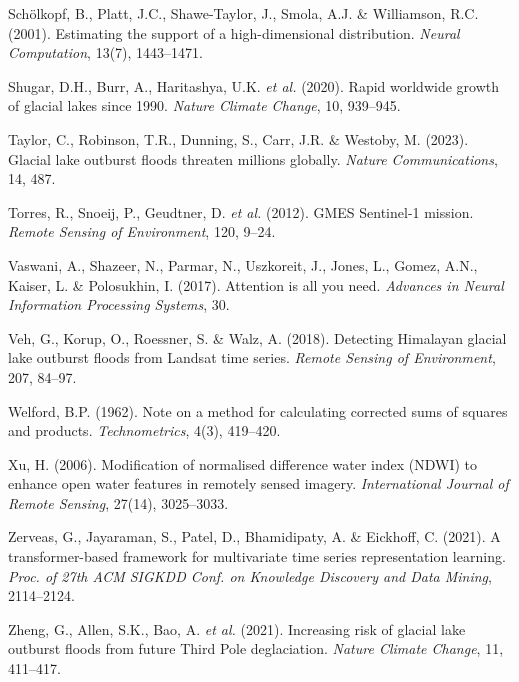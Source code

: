 \documentclass[10pt,twocolumn]{article}
\begin{document}
{\begin{list}{}{\setlength{\leftmargin}{1.4em}\setlength{\itemindent}{-1.4em}\setlength{\itemsep}{1.5pt}\setlength{\parsep}{0pt}\setlength{\topsep}{2pt}}
\item Sch\"olkopf, B., Platt, J.C., Shawe-Taylor, J., Smola, A.J. \& Williamson, R.C. (2001). Estimating the support of a high-dimensional distribution. \textit{Neural Computation}, 13(7), 1443--1471.
\item Shugar, D.H., Burr, A., Haritashya, U.K. \textit{et al.} (2020). Rapid worldwide growth of glacial lakes since 1990. \textit{Nature Climate Change}, 10, 939--945.
\item Taylor, C., Robinson, T.R., Dunning, S., Carr, J.R. \& Westoby, M. (2023). Glacial lake outburst floods threaten millions globally. \textit{Nature Communications}, 14, 487.
\item Torres, R., Snoeij, P., Geudtner, D. \textit{et al.} (2012). GMES Sentinel-1 mission. \textit{Remote Sensing of Environment}, 120, 9--24.
\item Vaswani, A., Shazeer, N., Parmar, N., Uszkoreit, J., Jones, L., Gomez, A.N., Kaiser, L. \& Polosukhin, I. (2017). Attention is all you need. \textit{Advances in Neural Information Processing Systems}, 30.
\item Veh, G., Korup, O., Roessner, S. \& Walz, A. (2018). Detecting Himalayan glacial lake outburst floods from Landsat time series. \textit{Remote Sensing of Environment}, 207, 84--97.
\item Welford, B.P. (1962). Note on a method for calculating corrected sums of squares and products. \textit{Technometrics}, 4(3), 419--420.
\item Xu, H. (2006). Modification of normalised difference water index (NDWI) to enhance open water features in remotely sensed imagery. \textit{International Journal of Remote Sensing}, 27(14), 3025--3033.
\item Zerveas, G., Jayaraman, S., Patel, D., Bhamidipaty, A. \& Eickhoff, C. (2021). A transformer-based framework for multivariate time series representation learning. \textit{Proc. of 27th ACM SIGKDD Conf. on Knowledge Discovery and Data Mining}, 2114--2124.
\item Zheng, G., Allen, S.K., Bao, A. \textit{et al.} (2021). Increasing risk of glacial lake outburst floods from future Third Pole deglaciation. \textit{Nature Climate Change}, 11, 411--417.
\end{list}}
\end{document}
